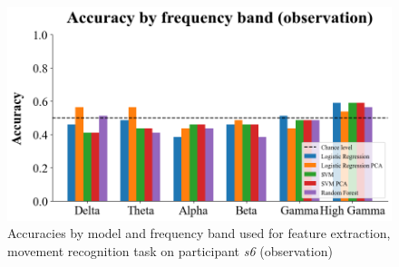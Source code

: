 \documentclass[10pt,conference,compsocconf]{IEEEtran}
\begin{document}
\begin{figure}[h!]
    \center
    \includegraphics[width=\linewidth]{../Code/figures/s6_accuracies_obs_freq_bands.png}
    \caption{Accuracies by model and frequency band used for feature extraction, movement recognition task on participant \textit{s6} (observation)}
    \label{appfig:accuracies_obs_freq_bands}
\end{figure}
\FloatBarrier


\newpage



\end{document}
